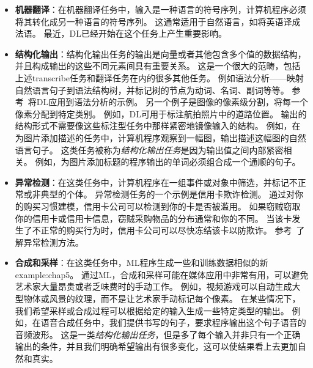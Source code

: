 \begin{itemize}
    \item \textbf{机器翻译}：在机器翻译任务中，输入是一种语言的符号序列，计算机程序必须将其转化成另一种语言的符号序列。
    这通常适用于自然语言，如将英语译成法语。
    最近，\gls{DL}已经开始在这个任务上产生重要影响\citep{Sutskever-et-al-NIPS2014,Bahdanau-et-al-ICLR2015-small}。

    \item \textbf{结构化输出}：结构化输出任务的输出是向量或者其他包含多个值的数据结构，并且构成输出的这些不同元素间具有重要关系。
    这是一个很大的范畴，包括上述\gls{transcribe}任务和翻译任务在内的很多其他任务。
    例如语法分析——映射自然语言句子到语法结构树，并标记树的节点为动词、名词、副词等等。
    参考~\cite{Collobert-AISTATS2011}将\gls{DL}应用到语法分析的示例。
    另一个例子是图像的像素级分割，将每一个像素分配到特定类别。
    例如，\gls{DL}可用于标注航拍照片中的道路位置\citep{MnihHinton2010}。
    输出的结构形式不需要像这些标注型任务中那样紧密地镜像输入的结构。
    例如，在为图片添加描述的任务中，计算机程序观察到一幅图，输出描述这幅图的自然语言句子\citep{Kiros-et-al-ICML2014,Kiros-et-al-arxiv2014,Mao-et-al-2014,Vinyals-et-al-CVPR2015,Donahue-et-al-arxiv2014,Karpathy+Li-CVPR2015,Fang-et-al-CVPR2015,Xu-et-al-ICML2015}。
    这类任务被称为\emph{结构化输出任务}是因为输出值之间内部紧密相关。
    例如，为图片添加标题的程序输出的单词必须组合成一个通顺的句子。


    \item \textbf{异常检测}：在这类任务中，计算机程序在一组事件或对象中筛选，并标记不正常或非典型的个体。
    异常检测任务的一个示例是信用卡欺诈检测。
    通过对你的购买习惯建模，信用卡公司可以检测到你的卡是否被滥用。
    如果窃贼窃取你的信用卡或信用卡信息，窃贼采购物品的分布通常和你的不同。
    当该卡发生了不正常的购买行为时，信用卡公司可以尽快冻结该卡以防欺诈。
    参考~\cite{chandola2009anomaly}了解异常检测方法。

    \item \textbf{合成和采样}：在这类任务中，\gls{ML}程序生成一些和训练数据相似的新\gls{example:chap5}。
    通过\gls{ML}，合成和采样可能在媒体应用中非常有用，可以避免艺术家大量昂贵或者乏味费时的手动工作。
    例如，视频游戏可以自动生成大型物体或风景的纹理，而不是让艺术家手动标记每个像素\citep{Luo+al-AISTATS2013-small}。
    在某些情况下，我们希望采样或合成过程可以根据给定的输入生成一些特定类型的输出。
    例如，在语音合成任务中，我们提供书写的句子，要求程序输出这个句子语音的音频波形。
    这是一类\emph{结构化输出任务}，但是多了每个输入并非只有一个正确输出的条件，并且我们明确希望输出有很多变化，这可以使结果看上去更加自然和真实。


\end{itemize}
